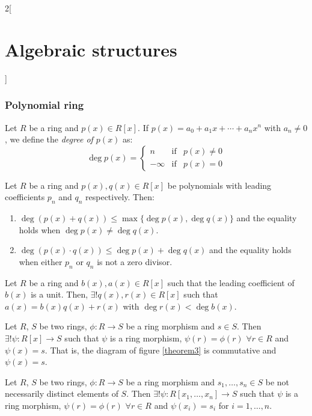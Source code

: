 \documentclass[../../../main.tex]{subfiles}
\begin{document}
\begin{multicols}{2}[\section{Algebraic structures}]
\subsubsection{Polynomial ring}
\begin{definition}
    Let $R$ be a ring and $p(x)\in R[x]$. If $p(x)=a_0+a_1x+\cdots+a_nx^n$ with $a_n\ne 0$, we define the \textit{degree of $p(x)$} as:
    \begin{equation*}
        \deg p(x)=\left\{
        \begin{array}{ccc}
            n & \text{if} & p(x)\ne 0 \\
            -\infty & \text{if} & p(x)= 0
        \end{array}\right.
    \end{equation*}
\end{definition}
\begin{prop}\label{AG-deg}
    Let $R$ be a ring and $p(x),q(x)\in R[x]$ be polynomials with leading coefficients $p_n$ and $q_n$ respectively. Then:
    \begin{enumerate}
        \item $\deg(p(x)+q(x))\leq\max\{\deg p(x),\deg q(x)\}$ and the equality holds when $\deg p(x)\ne\deg q(x)$.
        \item $\deg(p(x)\cdot q(x))\leq\deg p(x)+\deg q(x)$ and the equality holds when either $p_n$ or $q_n$ is not a zero divisor.
    \end{enumerate}
\end{prop}
\begin{prop}
    Let $R$ be a ring and $b(x),a(x)\in R[x]$ such that the leading coefficient of $b(x)$ is a unit. Then, $\exists! q(x),r(x)\in R[x]$ such that $a(x)=b(x)q(x)+r(x)$ with $\deg r(x)<\deg b(x)$.
\end{prop}
\begin{prop}
    Let $R$, $S$ be two rings, $\phi:R\rightarrow S$ be a ring morphism and $s\in S$. Then $\exists!\psi:R[x]\rightarrow S$ such that $\psi$ is a ring morphism, $\psi(r)=\phi(r)$ $\forall r\in R$ and $\psi(x)=s$. That is, the diagram of figure \ref{theorem3} is commutative and $\psi(x)=s$.
\end{prop}
\begin{prop}
    Let $R$, $S$ be two rings, $\phi:R\rightarrow S$ be a ring morphism and $s_1,\ldots,s_n\in S$ be not necessarily distinct elements of $S$. Then $\exists!\psi:R[x_1,\ldots,x_n]\rightarrow S$ such that $\psi$ is a ring morphism, $\psi(r)=\phi(r)$ $\forall r\in R$ and $\psi(x_i)=s_i$ for $i=1,\ldots,n$.

\end{prop}
\end{multicols}
\end{document}
